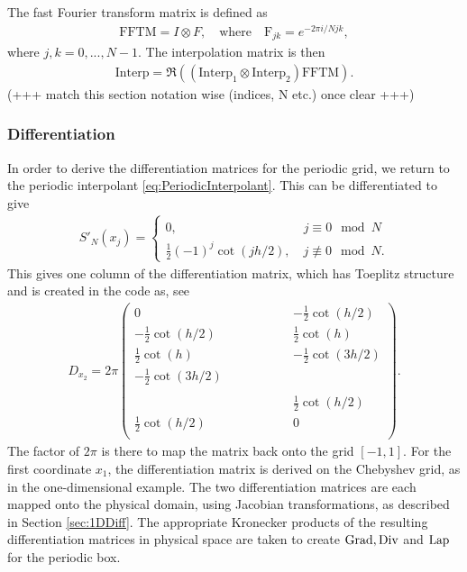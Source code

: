 The fast Fourier transform matrix is defined as
\begin{align*}
	\text{FFTM} = I \otimes F, \quad \text{where} \quad	\text{F}_{jk} =  e^{- 2 \pi i / N jk},
\end{align*}
where $j, k = 0,..., N -1$.
The interpolation matrix is then
\begin{align*}
	\text{Interp} = \Re\left(\left(\text{Interp}_{1} \otimes \text{Interp}_{2}\right) \text{FFTM}\right).
\end{align*}
(+++ match this section notation wise (indices, N etc.) once clear +++)

\subsubsection*{Differentiation}
In order to derive the differentiation matrices for the periodic grid, we return to the periodic interpolant \eqref{eq:PeriodicInterpolant}. This can be differentiated to give 
\begin{align*}
	S'_N(x_j) =\left\{\begin{array}{l} 0, \phantom{(-1)^j \cot(j h /2)} \quad j \equiv 0  \mod N\\
	\frac{1}{2} (-1)^j \cot(j h /2), \quad j \not \equiv 0  \mod N.\end{array}\right.
\end{align*}
This gives one column of the differentiation matrix, which has Toeplitz structure and is created in the code as, see \cite{bibTrefethen}
\begin{align*}
	D_{x_2} = 2\pi
	\begin{pmatrix}
		0 & & &  & &  & &-\frac{1}{2} \cot(h /2) \\
		-\frac{1}{2} \cot(h /2)&  & & &  & &   &\frac{1}{2} \cot(h) \\
		\frac{1}{2} \cot(h)& &  & & &    & & -\frac{1}{2} \cot(3 h /2)\\
		-\frac{1}{2} \cot( 3 h /2) & & &   & &  & & \\
		&  & & &   & &  & \\
		& & & &  & & & \frac{1}{2} \cot(h /2)\\
		\frac{1}{2} \cot(h /2)& &  & &   &  & & 0\\
	\end{pmatrix}.
\end{align*}
The factor of $2\pi$ is there to map the matrix back onto the grid $[-1,1]$. 
For the first coordinate $x_1$, the differentiation matrix is derived on the Chebyshev grid, as in the one-dimensional example. The two differentiation matrices are each mapped onto the physical domain, using Jacobian transformations, as described in Section \ref{sec:1DDiff}. The appropriate Kronecker products of the resulting differentiation matrices in physical space are taken to create $\operatorname{Grad}, \operatorname{Div}$ and $\operatorname{Lap}$ for the periodic box. 


